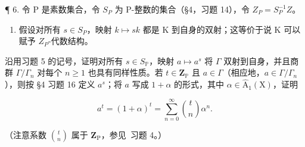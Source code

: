 ¶ 6. 令 P 是素数集合，令 \(S_P\) 为 P-整数的集合（§4，习题 14），令 \(Z_P = S_P^{-1}Z\)。

\begin{enumerate}
\def\labelenumi{(\alph{enumi})}
\tightlist
\item
  假设对所有 \(s \in S_{P}\)，映射 \(k \mapsto sk\) 都是 K 到自身的双射；这等价于说 K 可以赋予 \(Z_{P}\)-代数结构。
\end{enumerate}

沿用习题 5 的记号，证明对所有 \(s \in S_{\mathbb{P}}\)，映射 \(a \mapsto a^s\) 将 \(\Gamma\) 双射到自身，并且商群 \(\Gamma / \Gamma_n\) 对每个 \(n \geqslant 1\) 也具有同样性质。若 \(t \in \mathbf{Z}_{\mathbb{P}}\) 且 \(a \in \Gamma\)（相应地，\(a \in \Gamma / \Gamma_n\)），则按 §4 习题 16 定义 \(a^s\)；将 \(a\) 写成 \(1 + \alpha\) 的形式，其中 \(\alpha \in \hat{\mathrm{A}}_1(\mathrm{X})\)，证明

\[
a ^ {t} = (1 + \alpha) ^ {t} = \sum_ {n = 0} ^ {\infty} \binom {t} {n} \alpha^ {n}.
\]

（注意系数 \(\binom{t}{n}\) 属于 \(\mathbf{Z}_{\mathrm{P}}\)，参见~习题 4。）

